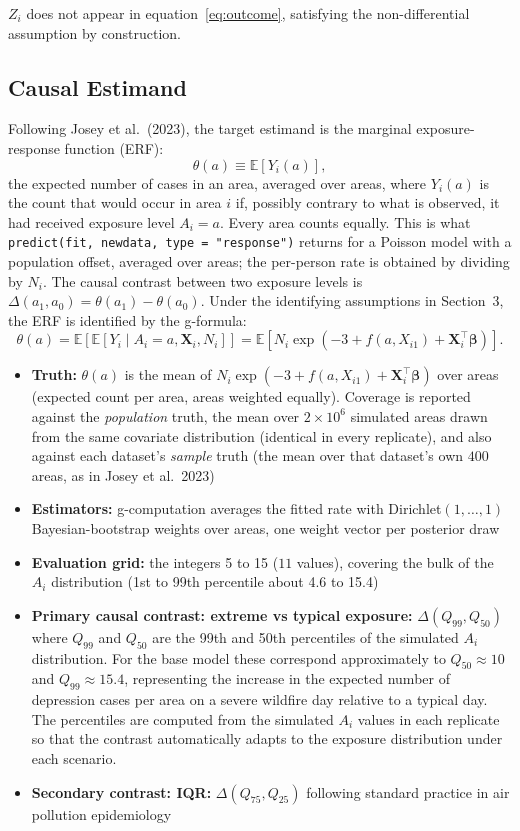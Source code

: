 \documentclass[11pt]{article}
\begin{document}
$Z_i$ does not appear in equation~\eqref{eq:outcome}, satisfying the non-differential
assumption by construction.

\subsection{Causal Estimand}

Following Josey et al.\ (2023), the target estimand is the marginal exposure-response
function (ERF):
\[
\theta(a) \equiv \mathbb{E}[Y_i(a)],
\]
the expected number of cases in an area, averaged over areas, where $Y_i(a)$ is the count that would occur in
area $i$ if, possibly contrary to what is observed, it had received exposure level $A_i = a$.
Every area counts equally. This is what \texttt{predict(fit, newdata, type = "response")} returns for a
Poisson model with a population offset, averaged over areas; the per-person rate is obtained by dividing by $N_i$. The causal contrast
between two exposure levels is $\Delta(a_1, a_0) = \theta(a_1) - \theta(a_0)$. Under
the identifying assumptions in Section~3, the ERF is identified by the g-formula:
\[
\theta(a) = \mathbb{E}\!\left[\mathbb{E}[Y_i \mid A_i = a, \mathbf{X}_i, N_i]\right]
= \mathbb{E}\!\left[N_i \exp(-3 + f(a, X_{i1}) + \mathbf{X}_i^\top\boldsymbol{\beta})\right].
\]

\begin{itemize}
\item \textbf{Truth:} $\theta(a)$ is the mean of $N_i \exp(-3 + f(a, X_{i1}) + \mathbf{X}_i^\top\boldsymbol{\beta})$
over areas (expected count per area, areas weighted equally). Coverage is reported against the \emph{population} truth, the mean over
$2\times 10^6$ simulated areas drawn from the same covariate distribution (identical in every replicate),
and also against each dataset's \emph{sample} truth (the mean over that dataset's own $400$ areas, as in
Josey et al.\ 2023)
\item \textbf{Estimators:} g-computation averages the fitted rate with Dirichlet$(1,\dots,1)$
Bayesian-bootstrap weights over areas, one weight vector per posterior draw
\item \textbf{Evaluation grid:} the integers 5 to 15 ($11$ values), covering the bulk of the
$A_i$ distribution (1st to 99th percentile about 4.6 to 15.4)
\item \textbf{Primary causal contrast: extreme vs typical exposure:}
$\Delta(Q_{99}, Q_{50})$ where $Q_{99}$ and $Q_{50}$ are the 99th and 50th percentiles
of the simulated $A_i$ distribution. For the base model these correspond
approximately to $Q_{50} \approx 10$ and $Q_{99} \approx 15.4$, representing
the increase in the expected number of depression cases per area on a severe wildfire day relative to a
typical day.
The percentiles are computed from the simulated $A_i$ values in each replicate so that
the contrast automatically adapts to the exposure distribution under each scenario.
\item \textbf{Secondary contrast: IQR:} $\Delta(Q_{75}, Q_{25})$ following standard
practice in air pollution epidemiology
\end{itemize}
\end{document}
